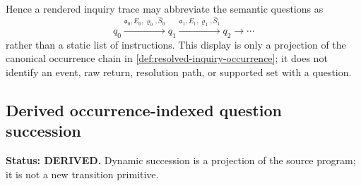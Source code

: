 \documentclass[11pt,oneside]{article}
\newcommand{\AskRef}{\mathfrak a}
\newcommand{\ResPath}{\varrho}
\begin{document}
Hence a rendered inquiry trace may abbreviate the semantic questions as
\[
\boxed{
q_0\xrightarrow{\AskRef_0,E_0,\ResPath_0,\widehat S_0}q_1
\xrightarrow{\AskRef_1,E_1,\ResPath_1,\widehat S_1}q_2\xrightarrow{}\cdots
}
\]
rather than a static list of instructions.  This display is only a projection of the canonical
occurrence chain in \cref{def:resolved-inquiry-occurrence}; it does not identify an event, raw
return, resolution path, or supported set with a question.

\subsection{Derived occurrence-indexed question succession}

\textbf{Status: DERIVED.}  Dynamic succession is a projection of the source program; it is not a
new transition primitive.
\end{document}

